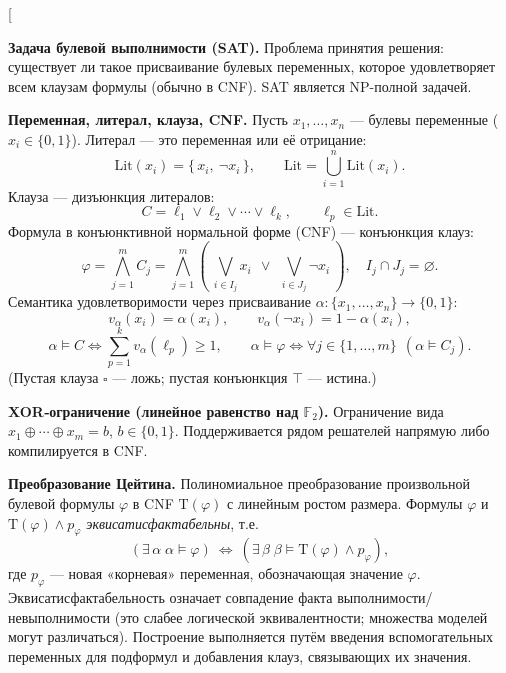 \begin{enumerate}[

\item \label{defsat:sat}
\textbf{Задача булевой выполнимости (SAT).}
Проблема принятия решения: существует ли такое присваивание булевых переменных, которое удовлетворяет всем клаузам формулы (обычно в CNF). SAT является NP-полной задачей.~\cite{Cook1971,HandbookSAT2021}

\item \label{defsat:cnf}
\textbf{Переменная, литерал, клауза, CNF.}
Пусть \(x_1,\dots,x_n\) — булевы переменные (\(x_i\in\{0,1\}\)).
Литерал — это переменная или её отрицание:
\[
\mathrm{Lit}(x_i)=\{\,x_i,\ \lnot x_i\,\},\qquad
\mathrm{Lit}=\bigcup_{i=1}^n \mathrm{Lit}(x_i).
\]
Клауза — дизъюнкция литералов:
\[
C=\ell_1\lor\ell_2\lor\cdots\lor\ell_k,\qquad \ell_p\in\mathrm{Lit}.
\]
Формула в конъюнктивной нормальной форме (CNF) — конъюнкция клауз:
\[
\varphi=\bigwedge_{j=1}^{m} C_j
=\bigwedge_{j=1}^{m}\left(\ \bigvee_{i\in I_j} x_i\ \ \lor\ \ \bigvee_{i\in J_j} \lnot x_i\ \right),
\quad I_j\cap J_j=\varnothing.
\]
Семантика удовлетворимости через присваивание \(\alpha:\{x_1,\dots,x_n\}\to\{0,1\}\):
\[
v_\alpha(x_i)=\alpha(x_i),\qquad v_\alpha(\lnot x_i)=1-\alpha(x_i),
\]
\[
\alpha\models C\iff \sum_{p=1}^{k} v_\alpha(\ell_p)\ge 1,
\qquad
\alpha\models \varphi\iff \forall j\in\{1,\dots,m\}\ \ (\alpha\models C_j).
\]
(Пустая клауза \(\square\) — ложь; пустая конъюнкция \(\top\) — истина.)
~\cite{HandbookSAT2021}

\item \label{defsat:xor}
\textbf{XOR‑ограничение (линейное равенство над \(\mathbb{F}_2\)).}
Ограничение вида \(x_1 \oplus \cdots \oplus x_m = b\), \(b\in\{0,1\}\).
Поддерживается рядом решателей напрямую либо компилируется в CNF.~\cite{SoosNohlCastelluccia2009,HandbookSAT2021}

\item \label{defsat:tseitin}
\textbf{Преобразование Цейтина.}
Полиномиальное преобразование произвольной булевой формулы \(\varphi\) в CNF \(\mathrm{T}(\varphi)\) с линейным ростом размера.
Формулы \(\varphi\) и \(\mathrm{T}(\varphi)\land p_\varphi\) \emph{эквисатисфактабельны}, т.е.
\[
(\exists\,\alpha\;\alpha\models\varphi)\ \Longleftrightarrow\ (\exists\,\beta\;\beta\models \mathrm{T}(\varphi)\land p_\varphi),
\]
где \(p_\varphi\) — новая «корневая» переменная, обозначающая значение \(\varphi\).
Эквисатисфактабельность означает совпадение факта выполнимости/невыполнимости (это слабее логической эквивалентности; множества моделей могут различаться).
Построение выполняется путём введения вспомогательных переменных для подформул и добавления клауз, связывающих их значения.
~\cite{Tseitin1983,HandbookSAT2021}


\end{enumerate}
